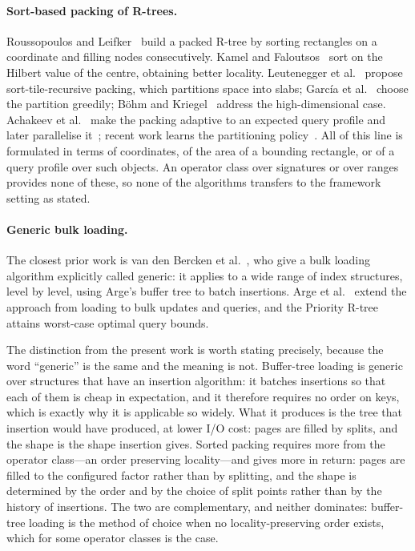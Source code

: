 \paragraph{Sort-based packing of R-trees.} Roussopoulos and
Leifker~\cite{roussopoulos1985direct} build a packed R-tree by sorting
rectangles on a coordinate and filling nodes consecutively. Kamel and
Faloutsos~\cite{kamel1993hilbert} sort on the Hilbert value of the centre,
obtaining better locality. Leutenegger et al.~\cite{leutenegger1997str} propose
sort-tile-recursive packing, which partitions space into slabs; Garc\'ia et
al.~\cite{garcia1998greedy} choose the partition greedily; B\"ohm and
Kriegel~\cite{bohm1999bulk} address the high-dimensional case. Achakeev et
al.~\cite{achakeev2012sort} make the packing adaptive to an expected query
profile and later parallelise it~\cite{achakeev2013parallel}; recent work
learns the partitioning policy~\cite{qi2023platon}. All of this line is
formulated in terms of coordinates, of the area of a bounding rectangle, or of
a query profile over such objects. An operator class over signatures or over
ranges provides none of these, so none of the algorithms transfers to the
framework setting as stated.

\paragraph{Generic bulk loading.} The closest prior work is van den Bercken et
al.~\cite{bercken1997generic}, who give a bulk loading algorithm explicitly
called generic: it applies to a wide range of index structures, level by level,
using Arge's buffer tree to batch insertions. Arge et
al.~\cite{arge2002bulk} extend the approach from loading to bulk updates and
queries, and the Priority R-tree~\cite{arge2004priority} attains worst-case
optimal query bounds.

The distinction from the present work is worth stating precisely, because the
word ``generic'' is the same and the meaning is not. Buffer-tree loading is
generic over structures that have an insertion algorithm: it batches insertions
so that each of them is cheap in expectation, and it therefore requires no
order on keys, which is exactly why it is applicable so widely. What it
produces is the tree that insertion would have produced, at lower I/O cost:
pages are filled by splits, and the shape is the shape insertion gives. Sorted
packing requires more from the operator class---an order preserving
locality---and gives more in return: pages are filled to the configured factor
rather than by splitting, and the shape is determined by the order and by the
choice of split points rather than by the history of insertions. The two are
complementary, and neither dominates: buffer-tree loading is the method of
choice when no locality-preserving order exists, which for some operator
classes is the case.

